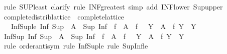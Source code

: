 \begin{isabellebody}
\isamarkupfalse%
\ {\isacharparenleft}{\kern0pt}rule\ SUP{\isacharunderscore}{\kern0pt}least{\isacharcomma}{\kern0pt}\ clarify{\isacharcomma}{\kern0pt}\ rule\ INF{\isacharunderscore}{\kern0pt}greatest{\isacharcomma}{\kern0pt}\ simp\ add{\isacharcolon}{\kern0pt}\ INF{\isacharunderscore}{\kern0pt}lower{}\ Sup{\isacharunderscore}{\kern0pt}upper{\isacharparenright}{\kern0pt}%
\endisatagproof
{\isafoldproof}%
%
\isadelimproof
\isanewline
%
\endisadelimproof
{}\isamarkupfalse%
\ \isanewline
\isanewline
{}\isamarkupfalse%
\ complete{\isacharunderscore}{\kern0pt}distrib{\isacharunderscore}{\kern0pt}lattice\ {\isacharequal}{\kern0pt}\ complete{\isacharunderscore}{\kern0pt}lattice\ {\isacharplus}{\kern0pt}\isanewline
\ \ \ Inf{\isacharunderscore}{\kern0pt}Sup{\isacharunderscore}{\kern0pt}le{\isacharcolon}{\kern0pt}\ {\isachardoublequoteopen}Inf\ {\isacharparenleft}{\kern0pt}Sup\ {\isacharbackquote}{\kern0pt}\ A{\isacharparenright}{\kern0pt}\ {\isasymle}\ Sup\ {\isacharparenleft}{\kern0pt}Inf\ {\isacharbackquote}{\kern0pt}\ {\isacharbraceleft}{\kern0pt}f\ {\isacharbackquote}{\kern0pt}\ A\ {\isacharbar}{\kern0pt}\ f\ {\isachardot}{\kern0pt}\ {\isacharparenleft}{\kern0pt}{\isasymforall}\ Y\ {\isasymin}\ A\ {\isachardot}{\kern0pt}\ f\ Y\ {\isasymin}\ Y{\isacharparenright}{\kern0pt}{\isacharbraceright}{\kern0pt}{\isacharparenright}{\kern0pt}{\isachardoublequoteclose}\isanewline
{}\isanewline
\ \ \isanewline
{}\isamarkupfalse%
\ Inf{\isacharunderscore}{\kern0pt}Sup{\isacharcolon}{\kern0pt}\ {\isachardoublequoteopen}Inf\ {\isacharparenleft}{\kern0pt}Sup\ {\isacharbackquote}{\kern0pt}\ A{\isacharparenright}{\kern0pt}\ {\isacharequal}{\kern0pt}\ Sup\ {\isacharparenleft}{\kern0pt}Inf\ {\isacharbackquote}{\kern0pt}\ {\isacharbraceleft}{\kern0pt}f\ {\isacharbackquote}{\kern0pt}\ A\ {\isacharbar}{\kern0pt}\ f\ {\isachardot}{\kern0pt}\ {\isacharparenleft}{\kern0pt}{\isasymforall}\ Y\ {\isasymin}\ A\ {\isachardot}{\kern0pt}\ f\ Y\ {\isasymin}\ Y{\isacharparenright}{\kern0pt}{\isacharbraceright}{\kern0pt}{\isacharparenright}{\kern0pt}{\isachardoublequoteclose}\isanewline
%
\isadelimproof
\ \ %
\endisadelimproof
%
\isatagproof
{}\isamarkupfalse%
\ {\isacharparenleft}{\kern0pt}rule\ order{\isachardot}{\kern0pt}antisym{\isacharcomma}{\kern0pt}\ rule\ Inf{\isacharunderscore}{\kern0pt}Sup{\isacharunderscore}{\kern0pt}le{\isacharcomma}{\kern0pt}\ rule\ Sup{\isacharunderscore}{\kern0pt}Inf{\isacharunderscore}{\kern0pt}le{\isacharparenright}{\kern0pt}%
\endisatagproof

\end{isabellebody}
